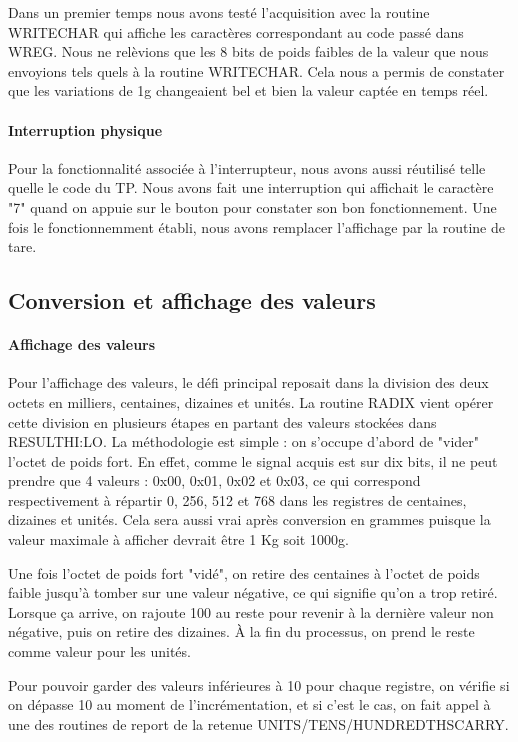 \documentclass[a4paper,11pt,titlepage]{article}
\begin{document}
Dans un premier temps nous avons testé l'acquisition avec la routine WRITECHAR qui affiche les caractères correspondant au code passé dans WREG. Nous ne relèvions que les 8 bits de poids faibles de la valeur que nous envoyions tels quels à la routine WRITECHAR. Cela nous a permis de constater que les variations de 1g changeaient bel et bien la valeur captée en temps réel.

\paragraph{Interruption physique}
Pour la fonctionnalité associée à l'interrupteur, nous avons aussi réutilisé telle quelle le code du TP. Nous avons fait une interruption qui affichait le caractère "7" quand on appuie sur le bouton pour constater son bon fonctionnement. Une fois le fonctionnemment établi, nous avons remplacer l'affichage par la routine de tare.

\subsection{Conversion et affichage des valeurs}
\paragraph{Affichage des valeurs}
Pour l'affichage des valeurs, le défi principal reposait dans la division des deux octets en milliers, centaines, dizaines et unités. La routine RADIX vient opérer cette division en plusieurs étapes en partant des valeurs stockées dans RESULTHI:LO.
La méthodologie est simple : on s'occupe d'abord de "vider" l'octet de poids fort. En effet, comme le signal acquis est sur dix bits, il ne peut prendre que 4 valeurs : 0x00, 0x01, 0x02 et 0x03, ce qui correspond respectivement à répartir 0, 256, 512 et 768 dans les registres de centaines, dizaines et unités. Cela sera aussi vrai après conversion en grammes puisque la valeur maximale à afficher devrait être 1 Kg soit 1000g.

Une fois l'octet de poids fort "vidé", on retire des centaines à l'octet de poids faible jusqu'à tomber sur une valeur négative, ce qui signifie qu'on a trop retiré. Lorsque ça arrive, on rajoute 100 au reste pour revenir à la dernière valeur non négative, puis on retire des dizaines. À la fin du processus, on prend le reste comme valeur pour les unités.

Pour pouvoir garder des valeurs inférieures à 10 pour chaque registre, on vérifie si on dépasse 10 au moment de l'incrémentation, et si c'est le cas, on fait appel à une des routines de report de la retenue UNITS/TENS/HUNDREDTHS\textunderscore CARRY.
\end{document}

